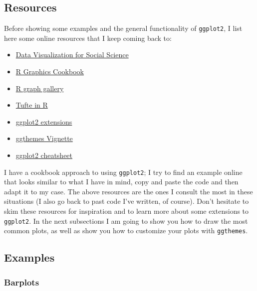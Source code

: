 \documentclass[]{gitbook}
\theoremstyle{definition}
\theoremstyle{definition}
\theoremstyle{definition}
\theoremstyle{remark}
\begin{document}
\hypertarget{resources}{%
\subsection{Resources}\label{resources}}

Before showing some examples and the general functionality of
\texttt{ggplot2}, I list here some online resources that I keep coming
back to:

\begin{itemize}
\item
  \href{http://socviz.co/}{Data Visualization for Social Science}
\item
  \href{http://www.cookbook-r.com/Graphs/}{R Graphics Cookbook}
\item
  \href{http://www.r-graph-gallery.com/portfolio/ggplot2-package/}{R
  graph gallery}
\item
  \href{http://motioninsocial.com/tufte/}{Tufte in R}
\item
  \href{http://www.ggplot2-exts.org/gallery/}{ggplot2 extensions}
\item
  \href{https://cran.r-project.org/web/packages/ggthemes/vignettes/ggthemes.html}{ggthemes
  Vignette}
\item
  \href{https://www.rstudio.com/wp-content/uploads/2015/03/ggplot2-cheatsheet.pdf}{ggplot2
  cheatsheet}
\end{itemize}

I have a cookbook approach to using \texttt{ggplot2}; I try to find an
example online that looks similar to what I have in mind, copy and paste
the code and then adapt it to my case. The above resources are the ones
I consult the most in these situations (I also go back to past code I've
written, of course). Don't hesitate to skim these resources for
inspiration and to learn more about some extensions to \texttt{ggplot2}.
In the next subsections I am going to show you how to draw the most
common plots, as well as show you how to customize your plots with
\texttt{ggthemes}.

\hypertarget{examples}{%
\subsection{Examples}\label{examples}}

\hypertarget{barplots}{%
\subsubsection{Barplots}\label{barplots}}
\end{document}
